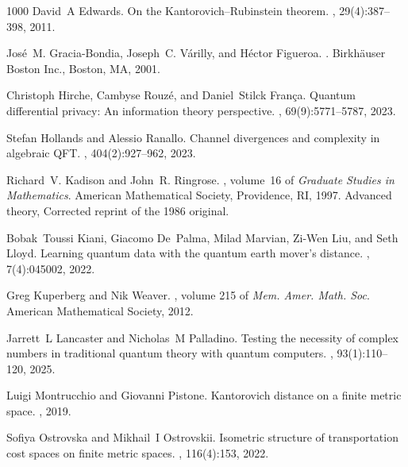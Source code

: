 \documentclass{amsart}[14pt]
\theoremstyle{definition}
\theoremstyle{remark}
\newcommand{\<}{\langle}
\renewcommand{\>}{\rangle}
\numberwithin{equation}{section}
\begin{document}
{\begin{thebibliography}{1000}
David~A Edwards.
\newblock On the Kantorovich--Rubinstein theorem.
, 29(4):387--398, 2011.

Jos\'e~M. Gracia-Bondia, Joseph~C. V{\'a}rilly, and H\'ector Figueroa.
.
\newblock Birkh{\"a}user Boston Inc., Boston, MA, 2001.

Christoph Hirche, Cambyse Rouz{\'e}, and Daniel~Stilck Fran{\c{c}}a.
\newblock Quantum differential privacy: An information theory perspective.
, 69(9):5771--5787,
  2023.

Stefan Hollands and Alessio Ranallo.
\newblock Channel divergences and complexity in algebraic QFT.
, 404(2):927--962, 2023.

Richard~V. Kadison and John~R. Ringrose.
,
  volume~16 of {\em Graduate Studies in Mathematics}.
\newblock American Mathematical Society, Providence, RI, 1997.
\newblock Advanced theory, Corrected reprint of the 1986 original.

Bobak~Toussi Kiani, Giacomo De~Palma, Milad Marvian, Zi-Wen Liu, and Seth
  Lloyd.
\newblock Learning quantum data with the quantum earth mover's distance.
, 7(4):045002, 2022.

Greg Kuperberg and Nik Weaver.
, volume 215
  of {\em Mem. Amer. Math. Soc}.
\newblock American Mathematical Society, 2012.

Jarrett~L Lancaster and Nicholas~M Palladino.
\newblock Testing the necessity of complex numbers in traditional quantum
  theory with quantum computers.
, 93(1):110--120, 2025.

Luigi Montrucchio and Giovanni Pistone.
\newblock Kantorovich distance on a finite metric space.
, 2019.

Sofiya Ostrovska and Mikhail~I Ostrovskii.
\newblock Isometric structure of transportation cost spaces on finite metric
  spaces.
, 116(4):153, 2022.


\end{thebibliography}}
\end{document}
